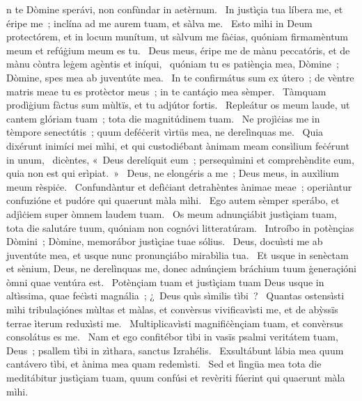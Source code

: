 { }
{%
n te Dòmine sperávi, non confùndar in aetèrnum. 
~In justìçia tua líbera me, et éripe me~; inclína ad me aurem tuam, et sàlva me. 
~Esto mìhi in Deum protectórem, et in locum munítum, ut sàlvum me fàċias, quóniam firmamèntum meum et refúġium meum es tu. 
~Deus meus, éripe me de mànu peccatóris, et de mànu còntra leġem agèntis et iníqui, 
~quóniam tu es patiènçia mea, Dòmine~; Dòmine, spes mea ab juventúte mea. 
~In te confirmátus sum ex útero~; de vèntre matris meae tu es protèctor meus~; in te cantáçio mea sèmper. 
~Tàmquam prodìġium fàctus sum mùltïs, et tu adjútor fortis. 
~Repleátur os meum laude, ut cantem glóriam tuam~; tota die magnitúdinem tuam. 
~Ne projìċias me in tèmpore senectútis~; quum deféċerit vìrtüs mea, ne derelìnquas me. 
~Quia dixérunt inimíci mei mìhi, et qui custodiébant ànimam meam consìlium feċérunt in unum, 
~dicèntes, «~Deus derelíquit eum~; persequìmini et comprehèndite eum, quia non est qui erìpiat.~»
~Deus, ne elongéris a me~; Deus meus, in auxìlium meum rèspiċe. 
~Confundàntur et defìċiant detrahèntes ànimae meae~; operiàntur confuzióne et pudóre qui quaerunt màla mìhi. 
~Ego autem sèmper sperábo, et adjìċiem super òmnem laudem tuam. 
~Os meum adnunçiábit justìçiam tuam, tota die salutáre tuum, quóniam non cognóvi litteratúram. 
~Introíbo in potènçias Dòmini~; Dòmine, memorábor justìçiae tuae sólius. 
~Deus, docuìsti me ab juventúte mea, et usque nunc pronunçiábo mirabìlia tua. 
~Et usque in senèctam et sènium, Deus, ne derelìnquas me, donec adnúnçiem bráchium tuum ġeneraçióni òmni quae ventúra est. 
~Potènçiam tuam et justìçiam tuam Deus usque in altìssima, quae feċìsti magnália~; ¿~Deus quìs sìmilis tìbi~? 
~Quantas ostensìsti mìhi tribulaçiónes mùltas et màlas, et convèrsus vivificavìsti me, et de abỳssïs terrae ìterum reduxìsti me. 
~Multiplicavìsti magnifiċènçiam tuam, et convèrsus consolátus es me. 
~Nam et ego confitébor tìbi in vasïs psalmi veritátem tuam, Deus~; psallem tìbi in zìthara, sanctus Izrahélis. 
~Exsultábunt lábia mea quum cantávero tìbi, et ànima mea quam redemìsti. 
~Sed et lìngüa mea tota die meditábitur justìçiam tuam, quum confúsi et revèriti fúerint qui quaerunt màla mìhi. 
}
